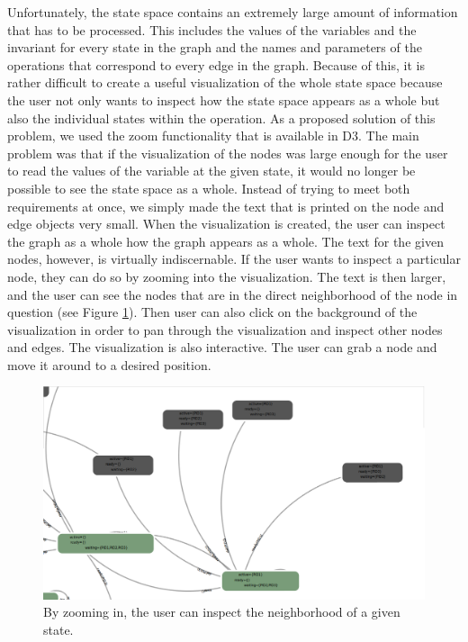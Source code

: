 Unfortunately, the state space contains an extremely large amount of information that has to be processed. This includes the values of the variables and the invariant for every state in the graph and the names and parameters of the operations that correspond to every edge in the graph. Because of this, it is rather difficult to create a useful visualization of the whole state space because the user not only wants to inspect how the state space appears as a whole but also the individual states within the operation. As a proposed solution of this problem, we used the zoom functionality that is available in D3. The main problem was that if the visualization of the nodes was large enough for the user to read the values of the variable at the given state, it would no longer be possible to see the state space as a whole. Instead of trying to meet both requirements at once, we simply made the text that is printed on the node and edge objects very small. When the visualization is created, the user can inspect the graph as a whole how the graph appears as a whole. The text for the given nodes, however, is virtually indiscernable. If the user wants to inspect a particular node, they can do so by zooming into the visualization. The text is then larger, and the user can see the nodes that are in the direct neighborhood of the node in question (see Figure \ref{neighborhood}). Then user can also click on the background of the visualization in order to pan through the visualization and inspect other nodes and edges. The visualization is also interactive. The user can grab a node and move it around to a desired position.

\begin{figure}[h!]
\centering
\includegraphics[width=14cm]{bilder/ss-neighborhood.png}
\caption{By zooming in, the user can inspect the neighborhood of a given state.}
\label{neighborhood}
\end{figure}

